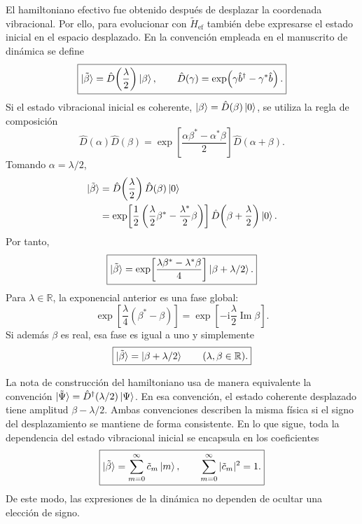 \documentclass[11pt]{article}
\newcommand{\ii}{\mathrm{i}}
\newcommand{\bdag}{\hat b^\dagger}
\begin{document}
El hamiltoniano efectivo fue obtenido despu\'es de desplazar la coordenada
vibracional. Por ello, para evolucionar con $\tilde H_{\mathrm{ef}}$ tambi\'en
debe expresarse el estado inicial en el espacio desplazado. En la convenci\'on
empleada en el manuscrito de din\'amica se define
\begin{equation}
  \boxed{
  \ket{\tilde\beta}
  =
  \hat D\!\left(\frac{\lambda}{2}\right)\ket{\beta},
  \qquad
  \hat D(\gamma)
  =
  \exp\!\left(\gamma\bdag-\gamma^*\hat b\right).
  }
\end{equation}
Si el estado vibracional inicial es coherente,
$\ket{\beta}=\hat D(\beta)\ket0$, se utiliza la regla de composici\'on
\begin{equation}
  \hat D(\alpha)\hat D(\beta)
  =
  \exp\!\left[
  \frac{\alpha\beta^*-\alpha^*\beta}{2}
  \right]
  \hat D(\alpha+\beta).
\end{equation}
Tomando $\alpha=\lambda/2$,
\begin{align}
  \ket{\tilde\beta}
  &=
  \hat D\!\left(\frac{\lambda}{2}\right)
  \hat D(\beta)\ket0
  \notag\\
  &=
  \exp\!\left[
  \frac{1}{2}
  \left(
  \frac{\lambda}{2}\beta^*
  -
  \frac{\lambda^*}{2}\beta
  \right)
  \right]
  \hat D\!\left(\beta+\frac{\lambda}{2}\right)\ket0.
\end{align}
Por tanto,
\begin{equation}
  \boxed{
  \ket{\tilde\beta}
  =
  \exp\!\left[
  \frac{\lambda\beta^*-\lambda^*\beta}{4}
  \right]
  \ket{\beta+\lambda/2}.
  }
\end{equation}
Para $\lambda\in\mathbb R$, la exponencial anterior es una fase global:
\begin{equation}
  \exp\!\left[
  \frac{\lambda}{4}(\beta^*-\beta)
  \right]
  =
  \exp\!\left[
  -\ii\frac{\lambda}{2}\operatorname{Im}\beta
  \right].
\end{equation}
Si adem\'as $\beta$ es real, esa fase es igual a uno y simplemente
\begin{equation}
  \boxed{
  \ket{\tilde\beta}
  =
  \ket{\beta+\lambda/2}
  \qquad
  (\lambda,\beta\in\mathbb R).
  }
\end{equation}

La nota de construcci\'on del hamiltoniano usa de manera equivalente la
convenci\'on
$\ket{\tilde\Psi}=\hat D^\dagger(\lambda/2)\ket{\Psi}$. En esa convenci\'on,
el estado coherente desplazado tiene amplitud $\beta-\lambda/2$. Ambas
convenciones describen la misma f\'isica si el signo del desplazamiento se
mantiene de forma consistente. En lo que sigue, toda la dependencia del
estado vibracional inicial se encapsula en los coeficientes
\begin{equation}
  \boxed{
  \ket{\tilde\beta}
  =
  \sum_{m=0}^{\infty}\tilde c_m\ket m,
  \qquad
  \sum_{m=0}^{\infty}|\tilde c_m|^2=1.
  }
\end{equation}
De este modo, las expresiones de la din\'amica no dependen de ocultar una
elecci\'on de signo.
\end{document}
